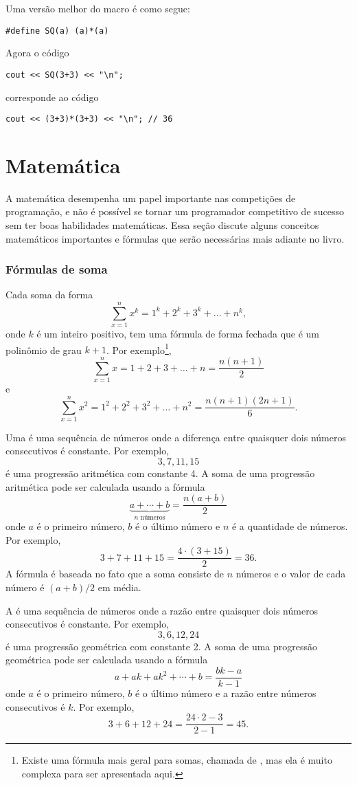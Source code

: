 Uma versão melhor do macro é como segue:
\begin{lstlisting}
#define SQ(a) (a)*(a)
\end{lstlisting}
Agora o código
\begin{lstlisting}
cout << SQ(3+3) << "\n";
\end{lstlisting}
corresponde ao código
\begin{lstlisting}
cout << (3+3)*(3+3) << "\n"; // 36
\end{lstlisting}


\section{Matemática}

A matemática desempenha um papel importante nas competições de programação,
e não é possível se tornar um programador competitivo de sucesso sem
ter boas habilidades matemáticas.
Essa seção discute alguns conceitos matemáticos importantes e fórmulas que
serão necessárias mais adiante no livro.

\subsubsection{Fórmulas de soma}

Cada soma da forma
\[\sum_{x=1}^n x^k = 1^k+2^k+3^k+\ldots+n^k,\]
onde $k$ é um inteiro positivo,
tem uma fórmula de forma fechada que é um polinômio de grau $k+1$.
Por exemplo\footnote{
Existe uma fórmula mais geral para somas, chamada de ,
mas ela é muito complexa para ser apresentada aqui.},
\[\sum_{x=1}^n x = 1+2+3+\ldots+n = \frac{n(n+1)}{2}\]
e
\[\sum_{x=1}^n x^2 = 1^2+2^2+3^2+\ldots+n^2 = \frac{n(n+1)(2n+1)}{6}.\]

Uma  é uma 
sequência de números onde a diferença entre quaisquer dois números consecutivos
é constante.
Por exemplo,
\[3, 7, 11, 15\]
é uma progressão aritmética com constante 4.
A soma de uma progressão aritmética pode ser calculada
usando a fórmula
\[\underbrace{a + \cdots + b}_{n \,\, \textrm{números}} = \frac{n(a+b)}{2}\]
onde $a$ é o primeiro número,
$b$ é o último número e
$n$ é a quantidade de números.
Por exemplo,
\[3+7+11+15=\frac{4 \cdot (3+15)}{2} = 36.\]
A fórmula é baseada no fato que a soma consiste de $n$ números e o valor de cada
número é $(a+b)/2$ em média.

A  é uma sequência de números onde a razão entre
quaisquer dois números consecutivos é constante.
Por exemplo,
\[3,6,12,24\]
é uma progressão geométrica com constante 2.
A soma de uma progressão geométrica pode ser calculada usando a fórmula
\[a + ak + ak^2 + \cdots + b = \frac{bk-a}{k-1}\]
onde $a$ é o primeiro número,
$b$ é o último número e a razão entre números consecutivos é $k$.
Por exemplo,
\[3+6+12+24=\frac{24 \cdot 2 - 3}{2-1} = 45.\]

